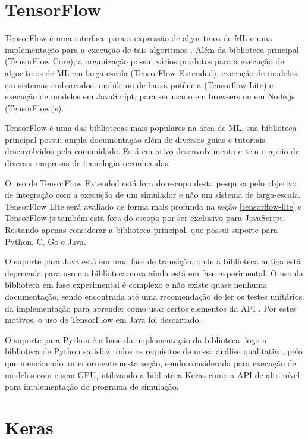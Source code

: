 \section{TensorFlow}

TensorFlow é uma interface para a expressão de algoritmos de ML e uma implementação para a execução de tais algoritmos \cite{tensorflow-2015}. Além da biblioteca principal (TensorFlow Core), a organização possui vários produtos para a execução de algoritmos de ML em larga-escala (TensorFlow Extended), execução de modelos em sistemas embarcados, mobile ou de baixa potência (Tensorflow Lite) e execução de modelos em JavaScript, para ser usado em browsers ou em Node.js (TensorFlow.js).

TensorFlow é uma das bibliotecas mais populares na área de ML, sua biblioteca principal possui ampla documentação além de diversos guias e tutoriais desenvolvidos pela comunidade. Está em ativo desenvolvimento e tem o apoio de diversas empresas de tecnologia reconhecidas.

O uso de TensorFlow Extended está fora do escopo desta pesquisa pelo objetivo de integração com a execução de um simulador e não um sistema de larga-escala. TensorFlow Lite será avaliado de forma mais profunda na seção \ref{tensorflow-lite} e TensorFlow.js também está fora do escopo por ser exclusivo para JavaScript. Restando apenas considerar a biblioteca principal, que possui suporte para Python, C, Go e Java.

O suporte para Java está em uma fase de transição, onde a biblioteca antiga está deprecada para uso e a biblioteca nova ainda está em fase experimental. O uso da biblioteca em fase experimental é complexo e não existe quase nenhuma documentação, sendo encontrada até uma recomendação de ler os testes unitários da implementação para aprender como usar certos elementos da \acrshort{API} \cite{tensorflow-unit-test-recommendation}. Por estes motivos, o uso de TensorFlow em Java foi descartado.

O suporte para Python é a base da implementação da biblioteca, logo a biblioteca de Python satisfaz todos os requisitos de nossa análise qualitativa, pelo que mencionado anteriormente nesta seção, sendo considerada para execução de modelos com e sem GPU, utilizando a biblioteca Keras como a \acrshort{API} de alto nível para implementação do programa de simulação.

\section{Keras}

